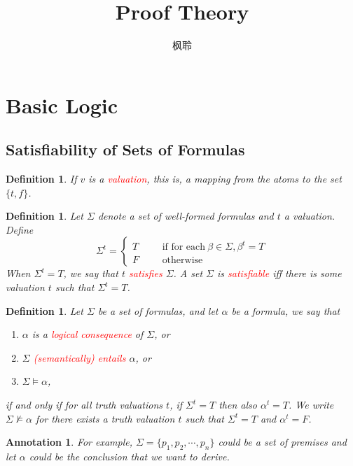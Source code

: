 \documentclass{article}
\theoremstyle{plain}
\newtheorem{definition}[theorem]{Definition}
\newtheorem{annotation}[theorem]{Annotation}
\theoremstyle{nonumberplain}
\newcommand{\redt}[1]{\textcolor{red}{#1}}
\begin{document}
\title{Proof Theory}
\author{枫聆}
\maketitle
\tableofcontents


\newpage
\section{Basic Logic}

\subsection{Satisfiability of Sets of Formulas}

\begin{definition}
\rm If $v$ is a \redt{valuation}, this is, a mapping from the atoms to the set $\{t,f\}$.   
\end{definition}


\begin{definition}
\rm \cite{cs245-sat} Let $\Sigma$ denote a set of well-formed formulas and $t$ a valuation. Define 
$$
\Sigma^t = \left\{
\begin{aligned}
T &&& \text{if for each}~\beta \in \Sigma, \beta^t = T \\
F &&& \text{otherwise}
\end{aligned}\right.
$$
When $\Sigma^t = T$, we say that $t$ \redt{satisfies} $\Sigma$. A set $\Sigma$ is \redt{satisfiable} iff there is some valuation $t$ such that $\Sigma^t = T$. 
\end{definition}


\begin{definition}
\rm Let $\Sigma$ be a set of formulas, and let $\alpha$ be a formula, we say that 
\begin{enumerate}
	\item $\alpha$ is a \redt{logical consequence} of $\Sigma$, or
	\item $\Sigma$ \redt{(semantically) entails} $\alpha$, or
	\item $\Sigma \models \alpha$,
\end{enumerate}
if and only if for all truth valuations $t$, if $\Sigma^t = T$ then also $\alpha^t = T$. We write $\Sigma \nvDash \alpha$ for there exists a truth valuation $t$ such that $\Sigma^t = T$ and $\alpha^t = F$. 
\end{definition}

\begin{annotation}
\rm For example, $\Sigma = \{p_1,p_2,\cdots,p_n\}$ could be a set of premises and let $\alpha$ could be the conclusion that we want to derive. 
\end{annotation}
\end{document}
